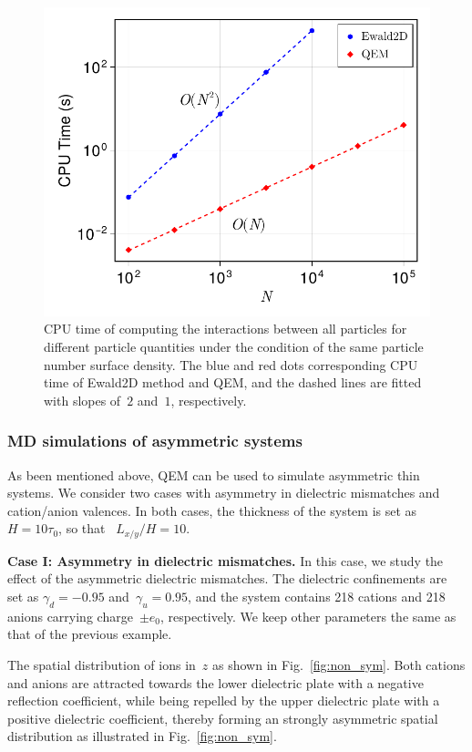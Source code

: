 \begin{figure}[htb]
    \centering
    \includegraphics[width = 0.625\linewidth]{figs/runtime.pdf}
    \caption{
    CPU time of computing the interactions between all particles for different particle quantities under the condition of the same particle number surface density.
    The blue and red dots corresponding CPU time of Ewald2D method and QEM, and the dashed lines are fitted with slopes of~$2$ and~$1$, respectively.
    }
    \label{fig:timecost}
\end{figure}

\subsubsection{MD simulations of asymmetric systems}
As been mentioned above, QEM can be used to simulate asymmetric thin systems.
We consider two cases with asymmetry in dielectric mismatches and cation/anion valences.
In both cases, the thickness of the system is set as~$H = 10 \tau_0$, so that ~$L_{x/y} / H = 10$.

\textbf{Case I: Asymmetry in dielectric mismatches.}
In this case, we study the effect of the asymmetric dielectric mismatches.
The dielectric confinements are set as $\gamma_d = -0.95$ and~$\gamma_u = 0.95$, and the system contains 218 cations and 218 anions carrying charge~$\pm e_0$, respectively.
We keep other parameters the same as that of the previous example.

The spatial distribution of ions in~$z$ as shown in Fig.~\ref{fig:non_sym}.
Both cations and anions are attracted towards the lower dielectric plate with a negative reflection coefficient, while being repelled by the upper dielectric plate with a positive dielectric coefficient, thereby forming an strongly asymmetric spatial distribution as illustrated in Fig.~\ref{fig:non_sym}.

